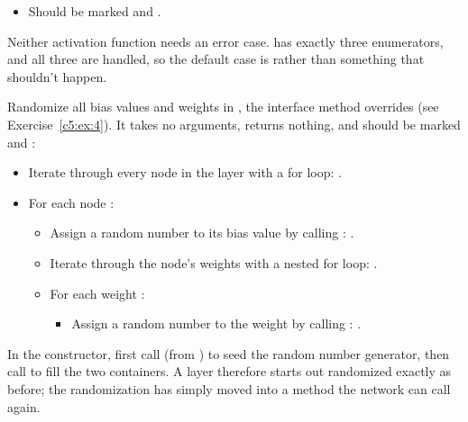 \begin{itemize}
\begin{itemize}
\begin{itemize}
\begin{itemize}
        \item {}: return  if , otherwise
          .
        \item {}: compute  and
          return .
        \item Default case (): return , the derivative of the
          identity function.
      \end{itemize}
    \end{itemize}
    \item Should be marked \code{[[nodiscard]]} and .
  \end{itemize}
\end{itemize}
Neither activation function needs an error case.  has exactly three enumerators, and
all three are handled, so the default case is  rather than something that shouldn't
happen.

\label{c5:ex:10}
Randomize all bias values and weights in , the interface method 
overrides (see Exercise~\ref{c5:ex:4}). It takes no arguments, returns nothing, and should be
marked  and :
\begin{itemize}
  \item Iterate through every node in the layer with a for loop:
    .
  \item For each node :
  \begin{itemize}
    \item Assign a random number to its bias value by calling :
      .
    \item Iterate through the node's weights with a nested for loop:
      .
    \item For each weight :
    \begin{itemize}
      \item Assign a random number to the weight by calling :
        .
    \end{itemize}
  \end{itemize}
\end{itemize}
In the constructor, first call  (from ) to seed the random
number generator, then call  to fill the two containers. A layer therefore
starts out randomized exactly as before; the randomization has simply moved into a method the
network can call again.

